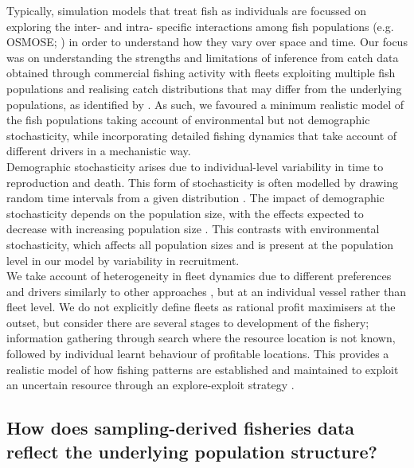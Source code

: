 \documentclass[review]{elsarticle}
\begin{document}
Typically, simulation models that treat fish as individuals are focussed on
exploring the inter- and intra- specific interactions among fish populations
(e.g. OSMOSE; \cite{Shin2004}) in order to understand how they vary over space
and time. Our focus was on understanding the strengths and limitations of
inference from catch data obtained through commercial fishing activity with
fleets exploiting multiple fish populations and realising catch distributions
that may differ from the underlying populations, as identified by
\cite{Gillis2008}. As such, we favoured a minimum realistic model of the fish
populations \citep{Plaganyi2014} taking account of environmental but not
demographic stochasticity, while incorporating detailed fishing dynamics that
take account of different drivers in a mechanistic way.  \\ 

Demographic stochasticity arises due to individual-level variability in time to
reproduction and death. This form of stochasticity is often modelled by drawing
random time intervals from a given distribution \citep{Gillespie1977}. The
impact of demographic stochasticity depends on the population size, with the
effects expected to decrease with increasing population size \citep{Lande2010}.
This contrasts with environmental stochasticity, which affects all population
sizes and is present at the population level in our model by variability in
recruitment. \\

We take account of heterogeneity in fleet dynamics due to different preferences
and drivers similarly to other approaches \citep{Fulton2011}, but at an
individual vessel rather than fleet level. We do not explicitly define fleets
as rational profit maximisers at the outset, but consider there are several
stages to development of the fishery; information gathering through search
where the resource location is not known, followed by individual learnt
behaviour of profitable locations.  This provides a realistic model of how
fishing patterns are established and maintained to exploit an uncertain
resource through an explore-exploit strategy \citep{Mangel1983, Bailey2018}. 

\subsection{How does sampling-derived fisheries data reflect the underlying
	population structure?}

\end{document}
